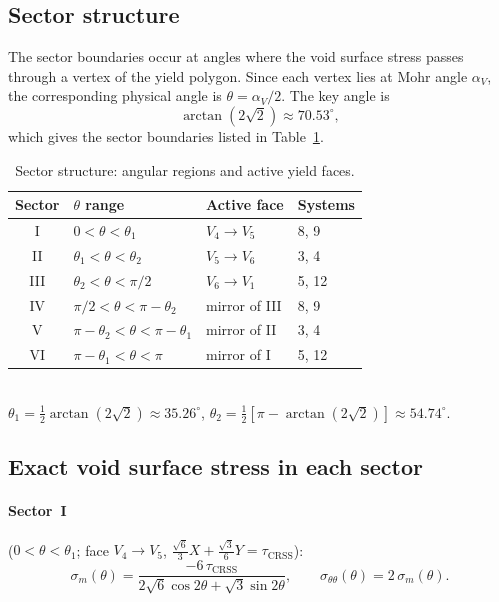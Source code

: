 \documentclass{svjour3} %
\newcommand{\tcrss}{\tau_{\mathrm{CRSS}}}
\newcommand{\stt}{\sigma_{\theta\theta}}
\newcommand{\sm}{\sigma_m}
\begin{document}
\subsection{Sector structure}
\label{sec:sectors}

The sector boundaries occur at angles where the void surface stress
passes through a vertex of the yield polygon. Since each vertex lies at
Mohr angle $\alpha_V$, the corresponding physical angle is
$\theta = \alpha_V / 2$. The key angle is
\begin{equation}
\label{eq:key_angle}
\arctan(2\sqrt{2}) \approx 70.53^\circ,
\end{equation}
which gives the sector boundaries listed in Table~\ref{tab:sectors}.

\begin{table}[htb]
\caption{Sector structure: angular regions and active yield faces.}
\label{tab:sectors}
\centering
\begin{tabular}{clll}
\toprule
Sector & $\theta$ range & Active face & Systems \\
\midrule
I   & $0 < \theta < \theta_1$ & $V_4 \to V_5$ & 8, 9 \\
II  & $\theta_1 < \theta < \theta_2$ & $V_5 \to V_6$ & 3, 4 \\
III & $\theta_2 < \theta < \pi/2$ & $V_6 \to V_1$ & 5, 12 \\
IV  & $\pi/2 < \theta < \pi - \theta_2$ & mirror of III & 8, 9 \\
V   & $\pi - \theta_2 < \theta < \pi - \theta_1$ & mirror of II & 3, 4 \\
VI  & $\pi - \theta_1 < \theta < \pi$ & mirror of I & 5, 12 \\
\bottomrule
\end{tabular}\\[4pt]
\footnotesize
$\theta_1 = \frac{1}{2}\arctan(2\sqrt{2}) \approx 35.26^\circ$, \quad
$\theta_2 = \frac{1}{2}[\pi - \arctan(2\sqrt{2})] \approx 54.74^\circ$.
\end{table}

\subsection{Exact void surface stress in each sector}

\paragraph{Sector~I} ($0 < \theta < \theta_1$; face $V_4 \to V_5$,
$\frac{\sqrt{6}}{3}X + \frac{\sqrt{3}}{6}Y = \tcrss$):
\begin{equation}
\label{eq:sector1}
\sm(\theta) = \frac{-6\,\tcrss}
  {2\sqrt{6}\cos 2\theta + \sqrt{3}\sin 2\theta}, \qquad
\stt(\theta) = 2\,\sm(\theta).
\end{equation}
\end{document}
